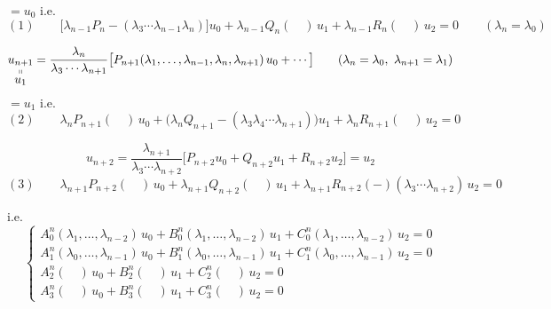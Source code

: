 \documentclass[11pt,a4paper]{article}
\begin{document}
$= u_0$ i.e.
\[
(1) \qquad \bigl[ \lambda_{n-1} P_n - (\lambda_3 \cdots \lambda_{n-1} \lambda_n) \bigr] u_0
 + \lambda_{n-1} Q_n(\quad)\, u_1 + \lambda_{n-1} R_n(\quad)\, u_2 = 0
 \qquad (\lambda_n = \lambda_0)
\]

\[
\underset{\textstyle u_1}{\underset{\shortparallel}{u_{n+1}}}
 = \frac{\lambda_n}{\lambda_3 \cdots \lambda_{n+1}}
 \bigl[ P_{n+1}(\lambda_1, \ldots, \lambda_{n-1}, \lambda_n, \lambda_{n+1})\, u_0
 + \cdots \bigr]
 \qquad (\lambda_n = \lambda_0,\ \lambda_{n+1} = \lambda_1)
\]
$= u_1$ i.e.
\[
(2) \qquad \lambda_n P_{n+1}(\quad)\, u_0
 + \bigl( \lambda_n Q_{n+1} - (\lambda_3 \lambda_4 \cdots \lambda_{n+1}) \bigr) u_1
 + \lambda_n R_{n+1}(\quad)\, u_2 = 0
\]

\[
u_{n+2} = \frac{\lambda_{n+1}}{\lambda_3 \cdots \lambda_{n+2}}
\bigl[ P_{n+2} u_0 + Q_{n+2} u_1 + R_{n+2} u_2 \bigr] = u_2
\]
\[
(3) \qquad \lambda_{n+1} P_{n+2}(\quad)\, u_0 + \lambda_{n+1} Q_{n+2}(\quad)\, u_1
 + \lambda_{n+1} R_{n+2}(-)(\lambda_3 \cdots \lambda_{n+2})\, u_2 = 0
\]

i.e. 
\[
\left\lbrace
\begin{array}{l}
A_0^n(\lambda_1, \ldots, \lambda_{n-2})\, u_0 + B_0^n(\lambda_1, \ldots, \lambda_{n-2})\, u_1
 + C_0^n(\lambda_1, \ldots, \lambda_{n-2})\, u_2 = 0 \\
A_1^n(\lambda_0, \ldots, \lambda_{n-1})\, u_0 + B_1^n(\lambda_0, \ldots, \lambda_{n-1})\, u_1
 + C_1^n(\lambda_0, \ldots, \lambda_{n-1})\, u_2 = 0 \\
A_2^n(\quad)\, u_0 + B_2^n(\quad)\, u_1 + C_2^n(\quad)\, u_2 = 0 \\
A_3^n(\quad)\, u_0 + B_3^n(\quad)\, u_1 + C_3^n(\quad)\, u_2 = 0
\end{array}
\right.
\]

\end{document}

